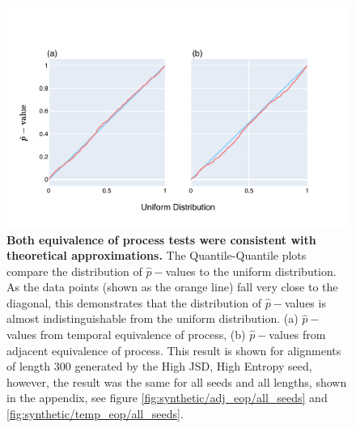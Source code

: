 \begin{figure}[htbp]
\centering
\includegraphics[width=\textwidth]{figures/plots/synthetic/adj-temp_eop/High JSD, High Entropy.pdf}
\caption{\textbf{Both equivalence of process tests were consistent with theoretical approximations.} The Quantile-Quantile plots compare the distribution of $\hat p-$values to the uniform distribution. As the data points (shown as the orange line) fall very close to the diagonal, this demonstrates that the distribution of $\hat p-$values is almost indistinguishable from the uniform distribution. (a) $\hat p-$values from temporal equivalence of process, (b) $\hat p-$values from adjacent equivalence of process. This result is shown for alignments of length 300 generated by the High JSD, High Entropy seed, however, the result was the same for all seeds and all lengths, shown in the appendix, see figure \ref{fig:synthetic/adj_eop/all_seeds} and \ref{fig:synthetic/temp_eop/all_seeds}.}
\label{fig:synthetic/adj-temp_eop/HighJSDHighEntropy}
\end{figure}